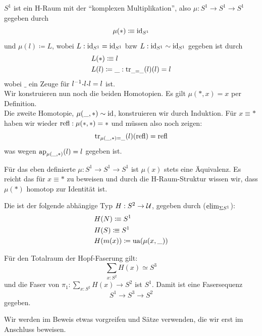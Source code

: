 \begin{beispiel}
  \(S^1\) ist ein H-Raum mit der ``komplexen Multiplikation'', also \(\mu:S^1\to S^1\to S^1\) gegeben durch
  \[\mu(\ast)\vcentcolon\mspace{-1.2mu}\equiv \mathrm{id}_{S^1}\]
  und \(\mu(l)\coloneq L\), wobei \(L:\mathrm{id}_{S^1}=\mathrm{id}_{S^1}\) bzw \(L:\mathrm{id}_{S^1}\sim \mathrm{id}_{S^1}\) gegeben ist durch
  \begin{align*}
    &L(\ast)\vcentcolon\mspace{-1.2mu}\equiv l \\
    &L(l)\coloneq \_ : \mathrm{tr}_{\_=\_}(l)(l)=l
  \end{align*}
  wobei \(\_\) ein Zeuge für \(l^{-1}\kon l\kon l=l\) ist. \\
  Wir konstruieren nun noch die beiden Homotopien.
  Es gilt \(\mu(\ast,x)=x\) per Definition. \\
   Die zweite Homotopie, \(\mu(\_,\ast)\sim \mathrm{id}\), konstruieren wir durch Induktion.
   Für \(x\equiv \ast\) haben wir wieder \(\mathrm{refl}:\mu(\ast,\ast)=\ast\) und müssen also noch zeigen:
   \[
      \mathrm{tr}_{\mu(\_,\ast)=\_}(l)(\mathrm{refl})=\mathrm{refl}
    \]
    was wegen \(\mathrm{ap}_{\mu(\_,\ast)}(l)=l\)  gegeben ist. 
\end{beispiel}

\begin{bemerkung}
  Für das eben definierte \(\mu:S^1\to S^1\to S^1\) ist \(\mu(x)\) stets eine Äquivalenz.
  Es reicht das für \(x\equiv \ast\) zu beweisen und durch die H-Raum-Struktur wissen wir, dass \(\mu(\ast)\) homotop zur Identität ist.
\end{bemerkung}

\begin{definition}
  \label{hopf-faserung}
  Die  ist der folgende abhängige Typ \(H:S^2\to \mathcal{U}\),
  gegeben durch (\(\mathrm{elim}_{\Sigma S^1}\)):
  \begin{align*}
    &H(N) \vcentcolon\mspace{-1.2mu}\equiv S^1 \\
    &H(S) \vcentcolon\mspace{-1.2mu}\equiv S^1 \\
    &H(m(x)) \coloneq \mathrm{ua}(\mu(x,\_))
  \end{align*}
\end{definition}

\begin{satz}
  Für den Totalraum der Hopf-Faserung gilt:
  \[
    \sum_{x:S^2}H(x) \simeq S^3
  \]
  und die Faser von \(\pi_1:\sum_{x:S^2}H(x)\to S^2\) ist \(S^1\).
  Damit ist eine Fasersequenz
  \[
     S^1\to S^3\to S^2
   \]
   gegeben.
\end{satz}

Wir werden im Beweis etwas vorgreifen und Sätze verwenden, die wir erst im Anschluss beweisen.

